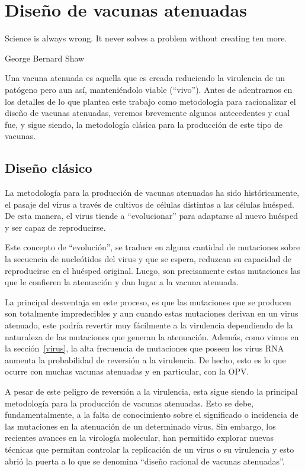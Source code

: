 \chapter{Dise\~no de vacunas atenuadas}
\label{diseno}
\epigraph{Science is always wrong. It never solves a problem without creating
ten more.}%
{George Bernard Shaw}

Una vacuna atenuada es aquella que es creada reduciendo la virulencia de un
pat\'ogeno pero aun as\'i, manteni\'endolo viable (``vivo''). Antes de
adentrarnos en los detalles de lo que plantea este trabajo como metodolog\'ia
para racionalizar el dise\~no de vacunas atenuadas, veremos brevemente algunos
antecedentes y cual fue, y sigue siendo, la metodolog\'ia cl\'asica para la
producci\'on de este tipo de vacunas.

\section{Dise\~no cl\'asico}

La metodolog\'ia para la producci\'on de vacunas atenuadas ha sido
hist\'oricamente, el pasaje del virus a trav\'es de cultivos de c\'elulas
distintas a las c\'elulas hu\'esped. De esta manera, el virus tiende a
``evolucionar'' para adaptarse al nuevo hu\'esped y ser capaz de reproducirse.

Este concepto de ``evoluci\'on'', se traduce en alguna cantidad de mutaciones
sobre la secuencia de nucle\'otidos del virus y que se espera, reduzcan su
capacidad de reproducirse en el hu\'esped original. Luego, son precisamente
estas mutaciones las que le confieren la atenuaci\'on y dan lugar a la vacuna
atenuada.

La principal desventaja en este proceso, es que las mutaciones que se producen
son totalmente impredecibles y aun cuando estas mutaciones derivan en un virus
atenuado, este podr\'ia revertir muy f\'acilmente a la virulencia dependiendo de
la naturaleza de las mutaciones que generan la atenuaci\'on\cite{Badgett02}.
Adem\'as, como vimos en la secci\'on~\ref{virus}, la alta frecuencia de
mutaciones que poseen los virus \ac{RNA} aumenta la probabilidad de reversi\'on
a la virulencia. De hecho, esto es lo que ocurre con muchas vacunas atenuadas y
en particular, con la \ac{OPV}.

A pesar de este peligro de reversi\'on a la virulencia, esta sigue siendo la
principal metodolog\'ia para la producci\'on de vacunas atenuadas. Esto se debe,
fundamentalmente, a la falta de conocimiento sobre el significado o incidencia
de las mutaciones en la atenuaci\'on de un determinado virus. Sin embargo, los
recientes avances en la virolog\'ia molecular, han permitido explorar nuevas
t\'ecnicas que permitan controlar la replicaci\'on de un virus o su virulencia y
esto abri\'o la puerta a lo que se denomina ``dise\~no racional de vacunas
atenuadas''\cite{Lauring10}.

